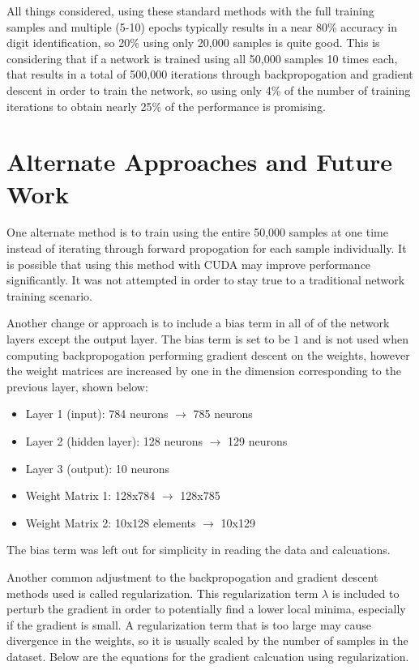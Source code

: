 \documentclass[11pt]{article}
\begin{document}
All things considered, using these standard methods with the full training samples and multiple (5-10) epochs typically results in a near 80\% accuracy in digit identification, so 20\% using only 20,000 samples is quite good. This is considering that if a network is trained using all 50,000 samples 10 times each, that results in a total of 500,000 iterations through backpropogation and gradient descent in order to train the network, so using only 4\% of the number of training iterations to obtain nearly 25\% of the performance is promising.

\section{Alternate Approaches and Future Work}
One alternate method is to train using the entire 50,000 samples at one time instead of iterating through forward propogation for each sample individually. It is possible that using this method with CUDA may improve performance significantly. It was not attempted in order to stay true to a traditional network training scenario.

Another change or approach is to include a bias term in all of of the network layers except the output layer. The bias term is set to be $1$ and is not used when computing backpropogation performing gradient descent on the weights, however the weight matrices are increased by one in the dimension corresponding to the previous layer, shown below:

\begin{itemize}
	\item Layer 1 (input): 784 neurons $\rightarrow$ 785 neurons
	\item Layer 2 (hidden layer): 128 neurons $\rightarrow$ 129 neurons
	\item Layer 3 (output): 10 neurons
	\item Weight Matrix 1: 128x784 $\rightarrow$ 128x785
	\item Weight Matrix 2: 10x128 elements $\rightarrow$ 10x129
\end{itemize}

The bias term was left out for simplicity in reading the data and calcuations.

Another common adjustment to the backpropogation and gradient descent methods used is called regularization. This regularization term $\lambda$ is included to perturb the gradient in order to potentially find a lower local minima, especially if the gradient is small. A regularization term that is too large may cause divergence in the weights, so it is usually scaled by the number of samples in the dataset. Below are the equations for the gradient calcuation using regularization. 
\end{document}
